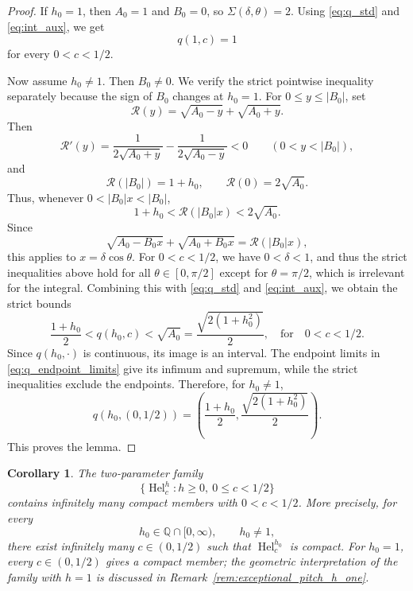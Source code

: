 \documentclass[a4paper,11pt]{amsart}
\numberwithin{equation}{section}
\theoremstyle{plain}
\newtheorem{coro}[thm]{Corollary}
\begin{document}
\begin{proof}
If $h_0=1$, then $A_0=1$ and $B_0=0$, so $\Sigma(\delta,\theta)=2$. Using
\eqref{eq:q_std} and \eqref{eq:int_aux}, we get
\[
q(1,c)=1
\]
for every $0<c<1/2$.

Now assume $h_0\neq1$. Then $B_0\neq0$. We verify the strict pointwise
inequality separately because the sign of $B_0$ changes at $h_0=1$.  For
$0\le y\le |B_0|$, set
\[
\mathcal R(y)=\sqrt{A_0-y}+\sqrt{A_0+y}.
\]
Then
\[
\mathcal R'(y)=\frac{1}{2\sqrt{A_0+y}}-\frac{1}{2\sqrt{A_0-y}}<0
\qquad(0<y<|B_0|),
\]
and
\[
\mathcal R(|B_0|)=1+h_0,
\qquad
\mathcal R(0)=2\sqrt{A_0}.
\]
Thus, whenever $0<|B_0|x<|B_0|$,
\[
1+h_0<\mathcal R(|B_0|x)<2\sqrt{A_0}.
\]
Since
\[
\sqrt{A_0-B_0x}+\sqrt{A_0+B_0x}=\mathcal R(|B_0|x),
\]
this applies to $x=\delta\cos\theta$.  For $0<c<1/2$, we have $0<\delta<1$, and thus the strict
inequalities above hold for all $\theta\in[0,\pi/2]$ except for
$\theta=\pi/2$, which is irrelevant for the integral. Combining this with
\eqref{eq:q_std} and
\eqref{eq:int_aux}, we obtain the strict bounds
\[
\frac{1+h_0}{2}
<
q(h_0,c)
<
\sqrt{A_0}
=
\frac{\sqrt{2(1+h_0^2)}}{2},\quad \text{for}\quad 0<c<1/2.
\]
Since $q(h_0,\cdot)$ is continuous, its image is an interval.  The endpoint limits in \eqref{eq:q_endpoint_limits} give its infimum and
supremum, while the strict inequalities exclude the endpoints. Therefore, for $h_0\neq1$,
\[
q(h_0,(0,1/2))
=
\left(
\frac{1+h_0}{2},
\frac{\sqrt{2(1+h_0^2)}}{2}
\right).
\]
This proves the lemma.
\end{proof}

\begin{coro}\label{cor:infinitely_many_compact}
The two-parameter family
\[
\{\operatorname{Hel}_c^h:h\geq0,\ 0\leq c<1/2\}
\]
contains infinitely many compact members with $0<c<1/2$.
More precisely, for every
\[
h_0\in\mathbb Q\cap[0,\infty),
\qquad
h_0\neq1,
\]
there exist infinitely many $c\in(0,1/2)$ such that
$\operatorname{Hel}_c^{h_0}$ is compact. For $h_0=1$, every
$c\in(0,1/2)$ gives a compact member; the geometric
interpretation of the family with $h=1$ is discussed in
Remark~\ref{rem:exceptional_pitch_h_one}.
\end{coro}
\end{document}
